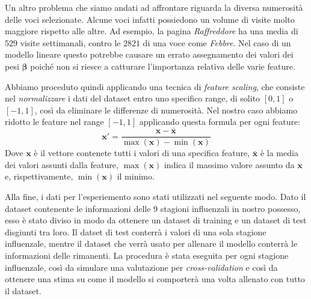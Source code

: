 Un altro problema che siamo andati ad affrontare riguarda la diversa numerosità delle voci selezionate. Alcune voci infatti 
possiedono un volume di visite molto maggiore rispetto alle altre. Ad esempio, la pagina \textit{Raffreddore} ha una media di 
$529$ visite settimanali, contro le $2821$ di una voce come \textit{Febbre}. Nel caso di un modello lineare questo potrebbe 
causare un errato assegnamento dei valori dei pesi $\bm{\beta}$ poiché non si riesce a catturare l'importanza relativa delle 
varie feature.
\bigskip

Abbiamo proceduto quindi applicando una tecnica di \textit{feature scaling}, che consiste nel \textit{normalizzare} i dati 
del dataset entro uno specifico range, di solito $[0, 1]$ o $[-1, 1]$, così da eliminare le differenze di numerosità. Nel 
nostro caso abbiamo ridotto le feature nel range $[-1, 1]$ applicando questa formula per ogni feature:
\begin{equation}
\bm{x}' = \frac{\bm{x}-\bar{\bm{x}}}{\max(\bm{x})-\min(\bm{x})}
\end{equation} 
Dove $\bm{x}$ è il vettore contenete tutti i valori di una specifica feature, $\bar{\bm{x}}$ è la media dei valori assunti dalla feature, $\max(\bm{x})$ indica il massimo valore assunto da $\bm{x}$ e, rispettivamente, $\min(\bm{x})$ il minimo.
\bigskip

Alla fine, i dati per l'esperiemento sono stati utilizzati nel seguente modo. Dato il dataset contenente le informazioni 
delle 9 stagioni influenzali in nostro possesso, esso è stato diviso in modo da ottenere un dataset di training e un dataset 
di test disgiunti tra loro. Il datset di test conterrà i valori di una sola stagione influenzale, mentre il dataset che verrà 
usato per allenare il modello conterrà le informazioni delle rimanenti. La procedura è stata eseguita 
per ogni stagione influenzale, così da simulare una valutazione per \textit{cross-validation} e così da ottenere una stima su 
come il modello si comporterà una volta allenato con tutto il dataset.
\bigskip
\newpage
